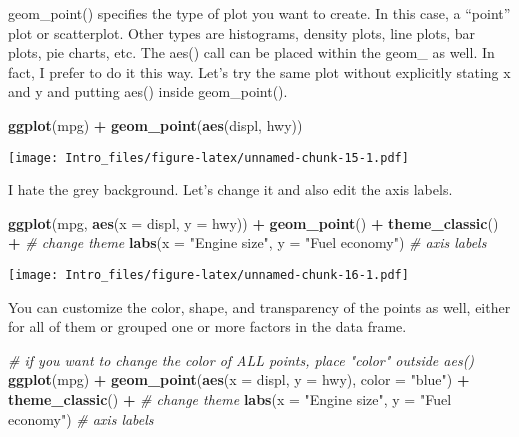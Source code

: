 \documentclass[
]{article}
\newenvironment{Shaded}{\begin{snugshade}}{\end{snugshade}}
\newcommand{\AttributeTok}[1]{\textcolor[rgb]{0.13,0.29,0.53}{#1}}
\newcommand{\CommentTok}[1]{\textcolor[rgb]{0.56,0.35,0.01}{\textit{#1}}}
\newcommand{\FunctionTok}[1]{\textcolor[rgb]{0.13,0.29,0.53}{\textbf{#1}}}
\newcommand{\NormalTok}[1]{#1}
\newcommand{\SpecialCharTok}[1]{\textcolor[rgb]{0.81,0.36,0.00}{\textbf{#1}}}
\newcommand{\StringTok}[1]{\textcolor[rgb]{0.31,0.60,0.02}{#1}}
\begin{document}
geom\_point() specifies the type of plot you want to create. In this
case, a ``point'' plot or scatterplot. Other types are histograms,
density plots, line plots, bar plots, pie charts, etc. The aes() call
can be placed within the geom\_ as well. In fact, I prefer to do it this
way. Let's try the same plot without explicitly stating x and y and
putting aes() inside geom\_point().

\begin{Shaded}
\begin{Highlighting}[]
\FunctionTok{ggplot}\NormalTok{(mpg) }\SpecialCharTok{+} 
  \FunctionTok{geom\_point}\NormalTok{(}\FunctionTok{aes}\NormalTok{(displ, hwy))}
\end{Highlighting}
\end{Shaded}

\texttt{[image: Intro\_files/figure-latex/unnamed-chunk-15-1.pdf]}

I hate the grey background. Let's change it and also edit the axis
labels.

\begin{Shaded}
\begin{Highlighting}[]
\FunctionTok{ggplot}\NormalTok{(mpg, }\FunctionTok{aes}\NormalTok{(}\AttributeTok{x =}\NormalTok{ displ, }\AttributeTok{y =}\NormalTok{ hwy)) }\SpecialCharTok{+} 
  \FunctionTok{geom\_point}\NormalTok{() }\SpecialCharTok{+} 
  \FunctionTok{theme\_classic}\NormalTok{() }\SpecialCharTok{+} \CommentTok{\# change theme}
  \FunctionTok{labs}\NormalTok{(}\AttributeTok{x =} \StringTok{"Engine size"}\NormalTok{, }\AttributeTok{y =} \StringTok{"Fuel economy"}\NormalTok{) }\CommentTok{\# axis labels}
\end{Highlighting}
\end{Shaded}

\texttt{[image: Intro\_files/figure-latex/unnamed-chunk-16-1.pdf]}

You can customize the color, shape, and transparency of the points as
well, either for all of them or grouped one or more factors in the data
frame.

\begin{Shaded}
\begin{Highlighting}[]
\CommentTok{\# if you want to change the color of ALL points, place "color" outside aes()}
\FunctionTok{ggplot}\NormalTok{(mpg) }\SpecialCharTok{+} 
  \FunctionTok{geom\_point}\NormalTok{(}\FunctionTok{aes}\NormalTok{(}\AttributeTok{x =}\NormalTok{ displ, }\AttributeTok{y =}\NormalTok{ hwy), }
             \AttributeTok{color =} \StringTok{"blue"}\NormalTok{) }\SpecialCharTok{+} 
  \FunctionTok{theme\_classic}\NormalTok{() }\SpecialCharTok{+} \CommentTok{\# change theme}
  \FunctionTok{labs}\NormalTok{(}\AttributeTok{x =} \StringTok{"Engine size"}\NormalTok{, }\AttributeTok{y =} \StringTok{"Fuel economy"}\NormalTok{) }\CommentTok{\# axis labels}
\end{Highlighting}
\end{Shaded}
\end{document}
